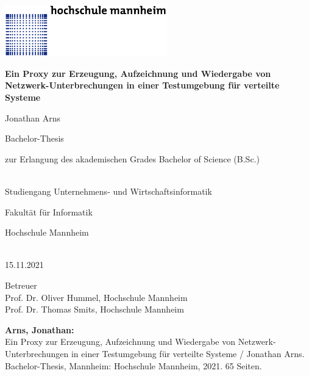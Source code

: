 \documentclass[12pt,a4paper]{report}
\begin{document}
\begin{titlepage}
	\noindent\includegraphics[width=7cm]{img/hs_logo.png}
	\begin{center}
		\sffamily
		\Large
		\textbf{Ein Proxy zur Erzeugung, Aufzeichnung und Wiedergabe von Netzwerk-Unterbrechungen in einer Testumgebung für verteilte Systeme}

		\vspace{1cm}

		\large
		\begin{Large}Jonathan Arns\end{Large}

		\vspace{1.5cm}


		Bachelor-Thesis\\
		\begin{small}zur Erlangung des akademischen Grades Bachelor of Science (B.Sc.)\end{small}\\
		Studiengang Unternehmens- und Wirtschaftsinformatik

		\vspace{1cm}

		Fakultät für Informatik\\
		\begin{Large}Hochschule Mannheim\end{Large}\\

		\vspace{1cm}
		15.11.2021

		\vfill

		Betreuer\\
		Prof. Dr. Oliver Hummel, Hochschule Mannheim\\
		Prof. Dr. Thomas Smits, Hochschule Mannheim\\
	\end{center}
\end{titlepage}


\setlength{\parindent}{0em}
\setlength{\parskip}{0.6em}

\begin{small}
	\thispagestyle{empty}
	\linespread{1}
	\textbf{Arns, Jonathan:}\\
	Ein Proxy zur Erzeugung, Aufzeichnung und Wiedergabe von Netzwerk-Unterbrechungen in einer Testumgebung für verteilte Systeme
	/ Jonathan Arns. \textemdash \\ Bachelor-Thesis, Mannheim: Hochschule Mannheim, 2021. 65 Seiten.
\end{small}
\end{document}

